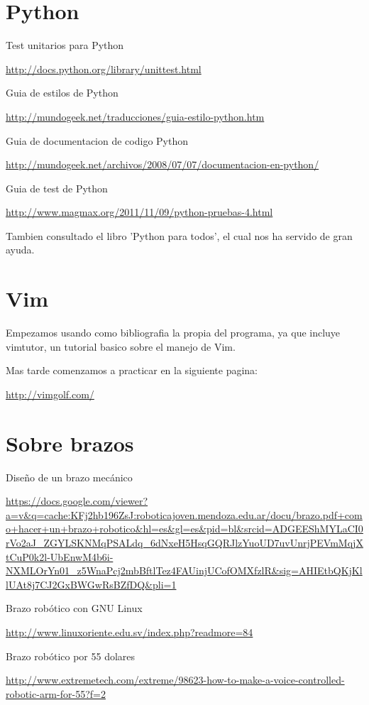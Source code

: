 \documentclass[12pt,a4paper]{report}
\begin{document}
\section{Python }
Test unitarios para Python

\url{http://docs.python.org/library/unittest.html}

Guia de estilos de Python

\url{http://mundogeek.net/traducciones/guia-estilo-python.htm}

Guia de documentacion de codigo Python

\url{http://mundogeek.net/archivos/2008/07/07/documentacion-en-python/}

Guia de test de Python

\url{http://www.magmax.org/2011/11/09/python-pruebas-4.html}

Tambien consultado el libro 'Python para todos', el cual nos ha servido de gran ayuda.

\section{Vim}

Empezamos usando como bibliografia la propia del programa, ya que incluye vimtutor, un tutorial basico sobre el manejo de Vim.

Mas tarde comenzamos a practicar en la siguiente pagina:

\url{http://vimgolf.com/}

\section{Sobre brazos}

Diseño de un brazo mecánico

\url{https://docs.google.com/viewer?a=v&q=cache:KFj2hb196ZsJ:roboticajoven.mendoza.edu.ar/docu/brazo.pdf+como+hacer+un+brazo+robotico&hl=es&gl=es&pid=bl&srcid=ADGEEShMYLaCI0rVo2aJ_ZGYLSKNMqPSALdq_6dNxeH5HsqGQRJlzYuoUD7uvUnrjPEVmMqjXtCuP0k2l-UbEnwM4b6i-NXMLOrYn01_z5WnaPcj2mbBftlTez4FAUinjUCofOMXfzlR&sig=AHIEtbQKjKllUAt8j7CJ2GxBWGwRsBZfDQ&pli=1}

Brazo robótico con GNU  Linux

\url{http://www.linuxoriente.edu.sv/index.php?readmore=84}

Brazo robótico por 55 dolares

\url{http://www.extremetech.com/extreme/98623-how-to-make-a-voice-controlled-robotic-arm-for-55?f=2}
\end{document}
